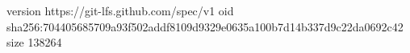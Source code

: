 version https://git-lfs.github.com/spec/v1
oid sha256:704405685709a93f502addf8109d9329e0635a100b7d14b337d9c22da0692c42
size 138264

